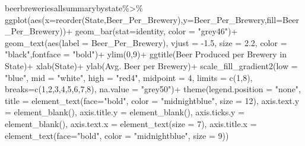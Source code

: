 \documentclass[
]{article}
\newenvironment{Shaded}{\begin{snugshade}}{\end{snugshade}}
\newcommand{\AttributeTok}[1]{\textcolor[rgb]{0.77,0.63,0.00}{#1}}
\newcommand{\DecValTok}[1]{\textcolor[rgb]{0.00,0.00,0.81}{#1}}
\newcommand{\FloatTok}[1]{\textcolor[rgb]{0.00,0.00,0.81}{#1}}
\newcommand{\FunctionTok}[1]{\textcolor[rgb]{0.00,0.00,0.00}{#1}}
\newcommand{\NormalTok}[1]{#1}
\newcommand{\SpecialCharTok}[1]{\textcolor[rgb]{0.00,0.00,0.00}{#1}}
\newcommand{\StringTok}[1]{\textcolor[rgb]{0.31,0.60,0.02}{#1}}
\begin{document}
\begin{Shaded}
\begin{Highlighting}[]
\NormalTok{beerbreweriesallsummarybystate}\SpecialCharTok{\%\textgreater{}\%}
  \FunctionTok{ggplot}\NormalTok{(}\FunctionTok{aes}\NormalTok{(}\AttributeTok{x=}\FunctionTok{reorder}\NormalTok{(State,Beer\_Per\_Brewery),}\AttributeTok{y=}\NormalTok{Beer\_Per\_Brewery,}\AttributeTok{fill=}\NormalTok{Beer\_Per\_Brewery))}\SpecialCharTok{+}
  \FunctionTok{geom\_bar}\NormalTok{(}\AttributeTok{stat=}\StringTok{\textquotesingle{}identity\textquotesingle{}}\NormalTok{, }\AttributeTok{color =} \StringTok{"grey46"}\NormalTok{)}\SpecialCharTok{+}
  \FunctionTok{geom\_text}\NormalTok{(}\FunctionTok{aes}\NormalTok{(}\AttributeTok{label  =}\NormalTok{ Beer\_Per\_Brewery), }\AttributeTok{vjust =} \SpecialCharTok{{-}}\FloatTok{1.5}\NormalTok{, }\AttributeTok{size =} \FloatTok{2.2}\NormalTok{, }\AttributeTok{color =} \StringTok{"black"}\NormalTok{,}\AttributeTok{fontface =}  \StringTok{"bold"}\NormalTok{)}\SpecialCharTok{+}
  \FunctionTok{ylim}\NormalTok{(}\DecValTok{0}\NormalTok{,}\DecValTok{9}\NormalTok{)}\SpecialCharTok{+}
  \FunctionTok{ggtitle}\NormalTok{(}\StringTok{\textquotesingle{}Beer Produced per Brewery in State\textquotesingle{}}\NormalTok{)}\SpecialCharTok{+}
  \FunctionTok{xlab}\NormalTok{(}\StringTok{\textquotesingle{}State\textquotesingle{}}\NormalTok{)}\SpecialCharTok{+}
  \FunctionTok{ylab}\NormalTok{(}\StringTok{\textquotesingle{}Avg. Beer per Brewery\textquotesingle{}}\NormalTok{)}\SpecialCharTok{+}
  \FunctionTok{scale\_fill\_gradient2}\NormalTok{(}\AttributeTok{low =} \StringTok{"blue"}\NormalTok{, }\AttributeTok{mid =} \StringTok{"white"}\NormalTok{, }\AttributeTok{high =} \StringTok{"red4"}\NormalTok{, }
                       \AttributeTok{midpoint =} \DecValTok{4}\NormalTok{, }\AttributeTok{limits =} \FunctionTok{c}\NormalTok{(}\DecValTok{1}\NormalTok{,}\DecValTok{8}\NormalTok{), }
                       \AttributeTok{breaks=}\FunctionTok{c}\NormalTok{(}\DecValTok{1}\NormalTok{,}\DecValTok{2}\NormalTok{,}\DecValTok{3}\NormalTok{,}\DecValTok{4}\NormalTok{,}\DecValTok{5}\NormalTok{,}\DecValTok{6}\NormalTok{,}\DecValTok{7}\NormalTok{,}\DecValTok{8}\NormalTok{), }\AttributeTok{na.value =} \StringTok{"grey50"}\NormalTok{)}\SpecialCharTok{+}
  \FunctionTok{theme}\NormalTok{(}\AttributeTok{legend.position =} \StringTok{"none"}\NormalTok{,}
        \AttributeTok{title =} \FunctionTok{element\_text}\NormalTok{(}\AttributeTok{face=}\StringTok{"bold"}\NormalTok{, }\AttributeTok{color =} \StringTok{"midnightblue"}\NormalTok{, }\AttributeTok{size =} \DecValTok{12}\NormalTok{),}
        \AttributeTok{axis.text.y =} \FunctionTok{element\_blank}\NormalTok{(),}
        \AttributeTok{axis.title.y =} \FunctionTok{element\_blank}\NormalTok{(),}
        \AttributeTok{axis.ticks.y =} \FunctionTok{element\_blank}\NormalTok{(),}
        \AttributeTok{axis.text.x =} \FunctionTok{element\_text}\NormalTok{(}\AttributeTok{size =} \DecValTok{7}\NormalTok{),}
        \AttributeTok{axis.title.x =} \FunctionTok{element\_text}\NormalTok{(}\AttributeTok{face=}\StringTok{"bold"}\NormalTok{, }\AttributeTok{color =} \StringTok{"midnightblue"}\NormalTok{, }\AttributeTok{size =} \DecValTok{9}\NormalTok{))}
\end{Highlighting}
\end{Shaded}
\end{document}
